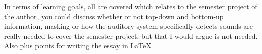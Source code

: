 \documentclass{article}
\begin{document}
In terms of learning goals, all are covered which relates to the semester project of the author, you could discuss whether or not top-down and bottom-up information, masking or how the auditory system specifically detects sounds are really needed to cover the semester project, but that I would argue is not needed.\\
Also plus points for writing the essay in \LaTeX


\end{document}
